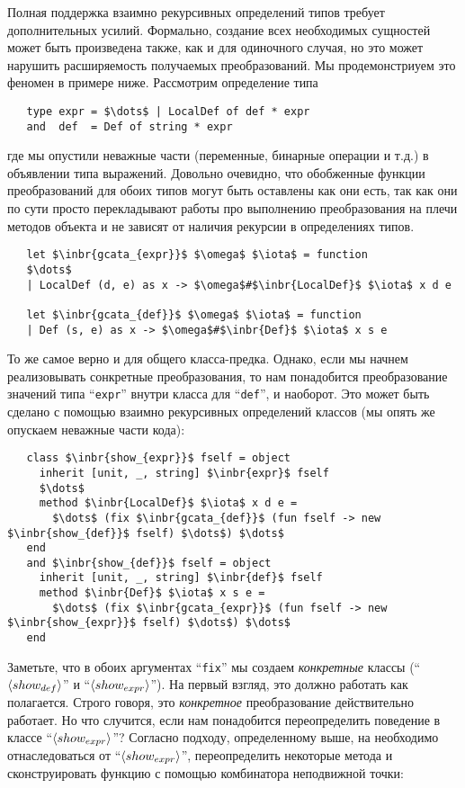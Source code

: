 Полная поддержка взаимно рекурсивных определений типов требует дополнительных усилий.
Формально, создание всех необходимых сущностей может быть произведена также, как и для 
одиночного случая, но это может нарушить расширяемость получаемых преобразований.
Мы продемонстриуем это феномен в примере ниже. Рассмотрим определение типа


\begin{lstlisting}
   type expr = $\dots$ | LocalDef of def * expr
   and  def  = Def of string * expr
\end{lstlisting}

где мы опустили неважные части (переменные, бинарные операции и т.д.) в объявлении типа выражений. Довольно очевидно, что обобженные функции преобразований для обоих типов могут  быть оставлены как они есть, так как они по сути просто перекладывают работы про выполнению преобразования на плечи методов объекта и не зависят от наличия рекурсии в определениях типов.

\begin{lstlisting}
   let $\inbr{gcata_{expr}}$ $\omega$ $\iota$ = function
   $\dots$
   | LocalDef (d, e) as x -> $\omega$#$\inbr{LocalDef}$ $\iota$ x d e

   let $\inbr{gcata_{def}}$ $\omega$ $\iota$ = function
   | Def (s, e) as x -> $\omega$#$\inbr{Def}$ $\iota$ x s e
\end{lstlisting}

То же самое верно и для общего класса-предка. Однако, если мы начнем реализовывать сонкретные преобразования, то нам понадобится преобразование значений 
типа ``\lstinline{expr}'' внутри класса для ``\lstinline{def}'', и наоборот. Это может быть сделано с помощью взаимно рекурсивных определений классов (мы опять же опускаем неважные части кода):

\begin{lstlisting}
   class $\inbr{show_{expr}}$ fself = object 
     inherit [unit, _, string] $\inbr{expr}$ fself
     $\dots$
     method $\inbr{LocalDef}$ $\iota$ x d e =
       $\dots$ (fix $\inbr{gcata_{def}}$ (fun fself -> new $\inbr{show_{def}}$ fself) $\dots$) $\dots$
   end
   and $\inbr{show_{def}}$ fself = object 
     inherit [unit, _, string] $\inbr{def}$ fself
     method $\inbr{Def}$ $\iota$ x s e =
       $\dots$ (fix $\inbr{gcata_{expr}}$ (fun fself -> new $\inbr{show_{expr}}$ fself) $\dots$) $\dots$
   end
\end{lstlisting}

Заметьте, что в обоих аргументах ``\lstinline{fix}'' мы создаем \emph{конкретные} классы  (``$\left<show_{def}\right>$'' и ``$\left<show_{expr}\right>$''). На первый взгляд, это должно работать как полагается. Строго говоря, это \emph{конкретное} преобразование действительно работает.
Но что случится, если нам понадобится переопределить поведение в классе 
 ``$\left<show_{expr}\right>$''? Согласно подходу, определенному выше, на необходимо отнаследоваться от ``$\left<show_{expr}\right>$'', переопределить некоторые метода и сконструировать функцию с помощью комбинатора неподвижной точки:

